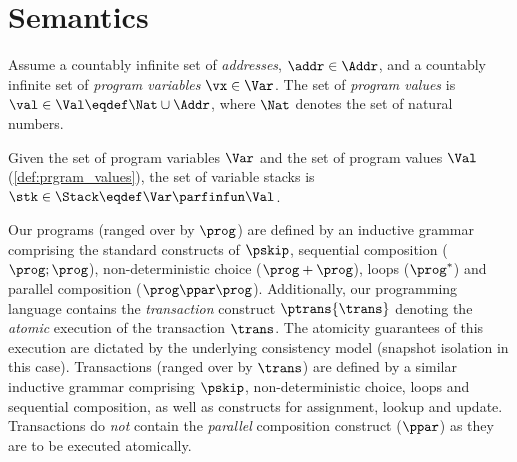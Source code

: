 \section{Semantics\label{sec:semantics}}
\begin{defn}
\label{def:prgram_values}
Assume a countably infinite set of \emph{addresses}, $\addr \in \Addr$, and a countably infinite set of \emph{program variables} $\vx \in {\Var}$. The set of \emph{program values} is $\val \in \Val \eqdef \Nat \cup \Addr$, where $\Nat$ denotes the set of natural numbers.
\end{defn}
%
\begin{defn}[Stacks]
\label{def:stacks}
Given the set of program variables $\Var$ and the set of program values $\Val$ (\ref{def:prgram_values}), the set of variable stacks is $\stk \in \Stack \eqdef \Var \parfinfun \Val$.
\end{defn}
%
Our programs (ranged over by $\prog$) are defined by an inductive grammar comprising the standard constructs of $\pskip$, sequential composition ($\prog; \prog$), non-deterministic choice ($\prog+\prog$), loops ($\prog^*$) and parallel composition ($\prog \ppar \prog$). Additionally, our programming language contains the \emph{transaction} construct $\ptrans{\trans}$ denoting the \emph{atomic} execution of the transaction $\trans$. The atomicity guarantees of this execution are dictated by the underlying consistency model (snapshot isolation in this case).
Transactions (ranged over by $\trans$) are defined by a similar inductive grammar comprising $\pskip$, non-deterministic choice, loops and sequential composition, as well as constructs for assignment, lookup and update. Transactions do \emph{not} contain the \emph{parallel} composition construct ($\ppar$) as they are to be executed atomically.

